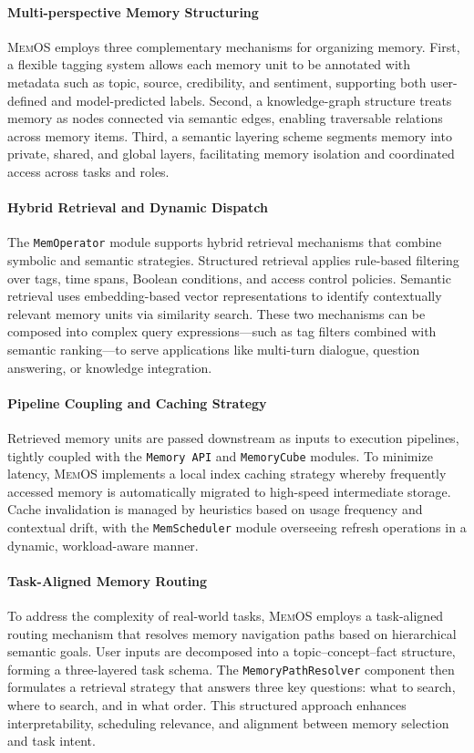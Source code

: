 \documentclass[]{memtensor}
\begin{document}
\paragraph{Multi-perspective Memory Structuring}
\textsc{MemOS} employs three complementary mechanisms for organizing memory. First, a flexible tagging system allows each memory unit to be annotated with metadata such as topic, source, credibility, and sentiment, supporting both user-defined and model-predicted labels. Second, a knowledge-graph structure treats memory as nodes connected via semantic edges, enabling traversable relations across memory items. Third, a semantic layering scheme segments memory into private, shared, and global layers, facilitating memory isolation and coordinated access across tasks and roles.

\paragraph{Hybrid Retrieval and Dynamic Dispatch}
The \texttt{MemOperator} module supports hybrid retrieval mechanisms that combine symbolic and semantic strategies. Structured retrieval applies rule-based filtering over tags, time spans, Boolean conditions, and access control policies. Semantic retrieval uses embedding-based vector representations to identify contextually relevant memory units via similarity search. These two mechanisms can be composed into complex query expressions—such as tag filters combined with semantic ranking—to serve applications like multi-turn dialogue, question answering, or knowledge integration.

\paragraph{Pipeline Coupling and Caching Strategy}
Retrieved memory units are passed downstream as inputs to execution pipelines, tightly coupled with the \texttt{Memory API} and \texttt{MemoryCube} modules. To minimize latency, \textsc{MemOS} implements a local index caching strategy whereby frequently accessed memory is automatically migrated to high-speed intermediate storage. Cache invalidation is managed by heuristics based on usage frequency and contextual drift, with the \texttt{MemScheduler} module overseeing refresh operations in a dynamic, workload-aware manner.

\paragraph{Task-Aligned Memory Routing}
To address the complexity of real-world tasks, \textsc{MemOS} employs a task-aligned routing mechanism that resolves memory navigation paths based on hierarchical semantic goals. User inputs are decomposed into a topic–concept–fact structure, forming a three-layered task schema. The \texttt{MemoryPathResolver} component then formulates a retrieval strategy that answers three key questions: what to search, where to search, and in what order. This structured approach enhances interpretability, scheduling relevance, and alignment between memory selection and task intent.
\end{document}
